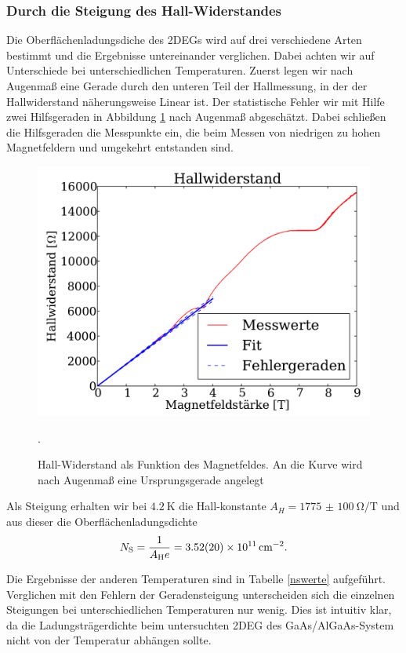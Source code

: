 \documentclass[paper=a4,fontsize=10pt,DIV=18,twocolumn,parskip=half]{scrartcl}
\numberwithin{equation}{section}    %
\begin{document}
\subsubsection*{Durch die Steigung des Hall-Widerstandes}
Die Oberflächenladungsdiche des 2DEGs wird auf drei verschiedene Arten bestimmt und die Ergebnisse untereinander verglichen. Dabei achten wir auf Unterschiede bei unterschiedlichen Temperaturen. Zuerst legen wir nach Augenmaß eine Gerade durch den unteren Teil der Hallmessung, in der der Hallwiderstand näherungsweise Linear ist. Der statistische Fehler wir mit Hilfe zwei Hilfsgeraden in Abbildung \ref{hallsteigung} nach Augenmaß abgeschätzt. Dabei schließen die Hilfsgeraden die Messpunkte ein, die beim Messen von niedrigen zu hohen Magnetfeldern und umgekehrt entstanden sind. 
\begin{figure}[htp]
	\begin{center}
		\includegraphics[width=\columnwidth]{Data-Plots/02-Hallsteigung.pdf}
		\caption{Hall-Widerstand als Funktion des Magnetfeldes. An die Kurve wird nach Augenmaß eine Ursprungsgerade angelegt}.
		\label{hallsteigung}
	\end{center}
\end{figure}
Als Steigung erhalten wir bei $\SI{4.2}{\kelvin}$ die Hall-konstante $A_H=\SI[per-mode=symbol]{1775(100)}{\ohm\per\tesla}$ und aus dieser die Oberflächenladungsdichte
\begin{equation}
N_{\rm S}=\frac{1}{A_{\rm H} e} = \SI{3.52(20)e11}{\per\square\centi\meter}.
\label{ns1}
\end{equation}

Die Ergebnisse der anderen Temperaturen sind in Tabelle \ref{nswerte} aufgeführt.
Verglichen mit den Fehlern der Geradensteigung unterscheiden sich die einzelnen Steigungen bei unterschiedlichen Temperaturen nur wenig. Dies ist intuitiv klar, da die Ladungsträgerdichte beim untersuchten 2DEG des GaAs/AlGaAs-System nicht von der Temperatur abhängen sollte.
\end{document}
